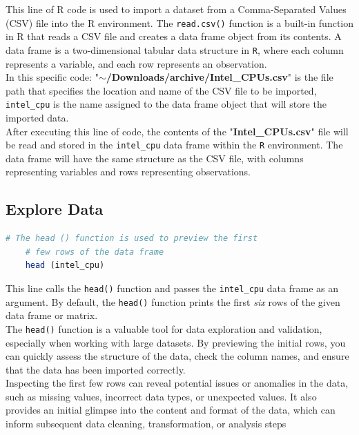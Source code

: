 This line of R code is used to import a dataset from a Comma-Separated Values (CSV) file into the R environment.
The \texttt{read.csv()} function is a built-in function in R that reads a CSV file and creates a data frame object from its contents. A data frame is a two-dimensional tabular data structure in \texttt{R}, where each column represents a variable, and each row represents an observation.\\

In this specific code:
"\textbf{$\sim$/Downloads/archive/Intel\_CPUs.csv}" is the file path that specifies the location and name of the CSV file to be imported, \texttt{intel\_cpu} is the name assigned to the data frame object that will store the imported data.\\

After executing this line of code, the contents of the "\textbf{Intel\_CPUs.csv}" file will be read and stored in the \texttt{intel\_cpu} data frame within the \texttt{R} environment. The data frame will have the same structure as the CSV file, with columns representing variables and rows representing observations.

\subsection{Explore Data}
\begin{lstlisting}[language=R]
    # The head () function is used to preview the first 
    # few rows of the data frame
    head (intel_cpu)
\end{lstlisting}

This line calls the \texttt{head()} function and passes the \texttt{intel\_cpu} data frame as an argument. By default, the \texttt{head()} function prints the first \textit{six} rows of the given data frame or matrix.\\

The \texttt{head()} function is a valuable tool for data exploration and validation, especially when working with large datasets. By previewing the initial rows, you can quickly assess the structure of the data, check the column names, and ensure that the data has been imported correctly.\\

Inspecting the first few rows can reveal potential issues or anomalies in the data, such as missing values, incorrect data types, or unexpected values. It also provides an initial glimpse into the content and format of the data, which can inform subsequent data cleaning, transformation, or analysis steps

